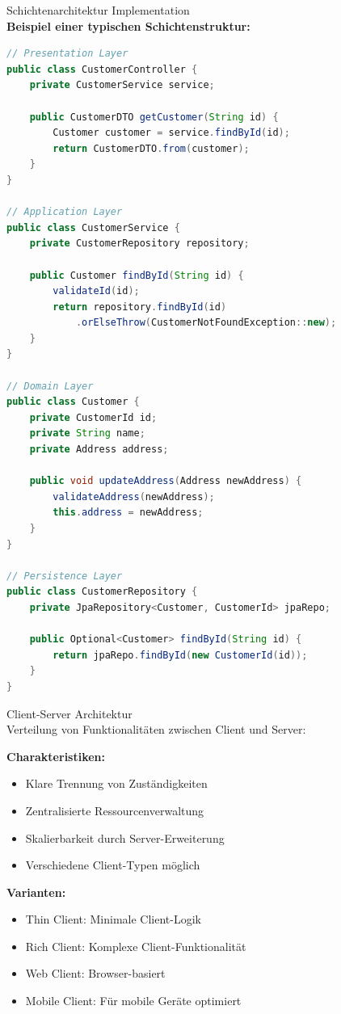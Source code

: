 \begin{example2}{Schichtenarchitektur Implementation}\\
\textbf{Beispiel einer typischen Schichtenstruktur:}

\begin{lstlisting}[language=Java, style=basesmol]
// Presentation Layer
public class CustomerController {
    private CustomerService service;
    
    public CustomerDTO getCustomer(String id) {
        Customer customer = service.findById(id);
        return CustomerDTO.from(customer);
    }
}

// Application Layer
public class CustomerService {
    private CustomerRepository repository;
    
    public Customer findById(String id) {
        validateId(id);
        return repository.findById(id)
            .orElseThrow(CustomerNotFoundException::new);
    }
}

// Domain Layer
public class Customer {
    private CustomerId id;
    private String name;
    private Address address;
    
    public void updateAddress(Address newAddress) {
        validateAddress(newAddress);
        this.address = newAddress;
    }
}

// Persistence Layer
public class CustomerRepository {
    private JpaRepository<Customer, CustomerId> jpaRepo;
    
    public Optional<Customer> findById(String id) {
        return jpaRepo.findById(new CustomerId(id));
    }
}
\end{lstlisting}
\end{example2}

\begin{concept}{Client-Server Architektur}\\
Verteilung von Funktionalitäten zwischen Client und Server:

\textbf{Charakteristiken:}
\begin{itemize}
    \item Klare Trennung von Zuständigkeiten
    \item Zentralisierte Ressourcenverwaltung
    \item Skalierbarkeit durch Server-Erweiterung
    \item Verschiedene Client-Typen möglich
\end{itemize}

\textbf{Varianten:}
\begin{itemize}
    \item Thin Client: Minimale Client-Logik
    \item Rich Client: Komplexe Client-Funktionalität
    \item Web Client: Browser-basiert
    \item Mobile Client: Für mobile Geräte optimiert
\end{itemize}
\end{concept}

